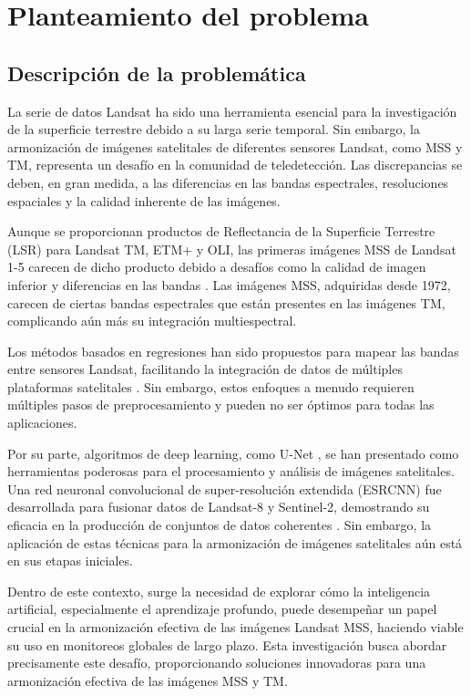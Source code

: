     \section{Planteamiento del problema}
        \subsection{Descripción de la problemática}
            La serie de datos Landsat ha sido una herramienta esencial para la investigación de la superficie terrestre debido a su larga serie temporal. Sin embargo, la armonización de imágenes satelitales de diferentes sensores Landsat, como MSS y TM, representa un desafío en la comunidad de teledetección. Las discrepancias se deben, en gran medida, a las diferencias en las bandas espectrales, resoluciones espaciales y la calidad inherente de las imágenes.
            
            Aunque se proporcionan productos de Reflectancia de la Superficie Terrestre (LSR) para Landsat TM, ETM+ y OLI, las primeras imágenes MSS de Landsat 1-5 carecen de dicho producto debido a desafíos como la calidad de imagen inferior y diferencias en las bandas \autocite{zhao2022framework}. Las imágenes MSS, adquiridas desde 1972, carecen de ciertas bandas espectrales que están presentes en las imágenes TM, complicando aún más su integración multiespectral.
            
            Los métodos basados en regresiones han sido propuestos para mapear las bandas entre sensores Landsat, facilitando la integración de datos de múltiples plataformas satelitales \autocite{roy2016characterization}. Sin embargo, estos enfoques a menudo requieren múltiples pasos de preprocesamiento y pueden no ser óptimos para todas las aplicaciones.
            
            Por su parte, algoritmos de deep learning, como U-Net \autocite{ronneberger2015u}, se han presentado como herramientas poderosas para el procesamiento y análisis de imágenes satelitales. Una red neuronal convolucional de super-resolución extendida (ESRCNN) fue desarrollada para fusionar datos de Landsat-8 y Sentinel-2, demostrando su eficacia en la producción de conjuntos de datos coherentes \autocite{shao2019deep}. Sin embargo, la aplicación de estas técnicas para la armonización de imágenes satelitales aún está en sus etapas iniciales.
    
            Dentro de este contexto, surge la necesidad de explorar cómo la inteligencia artificial, especialmente el aprendizaje profundo, puede desempeñar un papel crucial en la armonización efectiva de las imágenes Landsat MSS, haciendo viable su uso en monitoreos globales de largo plazo. Esta investigación busca abordar precisamente este desafío, proporcionando soluciones innovadoras para una armonización efectiva de las imágenes MSS y TM.
            
